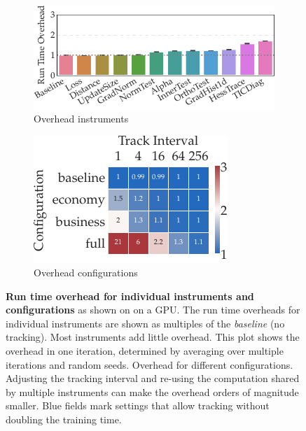 \begin{figure}
  \centering
  \begin{subfigure}[t]{0.6\linewidth}
    \centering
    \includegraphics[width=\linewidth]{../repos/cockpit-paper/fig/01_benchmark/output/fig_individual/benchmark_cifar10_3c3d_cuda_thesis-wide}
    \caption{Overhead \cockpit instruments}
    \label{cockpit::fig:benchmark-instruments}
  \end{subfigure}
  \hfill
  \begin{subfigure}[t]{0.35\linewidth}
    \centering
    \includegraphics[width=\linewidth]{../repos/cockpit-paper/fig/01_benchmark/output/fig_grid/benchmark_cifar10_3c3d_cuda_thesis-wide}
    \caption{Overhead \cockpit configurations}
    \label{cockpit::fig:benchmark_heatmap}
  \end{subfigure}
  \caption{\textbf{Run time overhead for individual \cockpittitle instruments
      and configurations} as shown on \cifarten \threecthreed on a GPU.
     The run time overheads for
    individual instruments are shown as multiples of the \emph{baseline} (no
    tracking). Most instruments add little overhead. This plot shows the
    overhead in one iteration, determined by averaging over multiple iterations
    and random seeds.  Overhead for
    different \cockpit configurations. Adjusting the tracking interval and
    re-using the computation shared by multiple instruments can make the
    overhead orders of magnitude smaller. Blue fields mark settings that allow
    tracking without doubling the training time.}
  \label{cockpit::fig:benchmark}
\end{figure}

